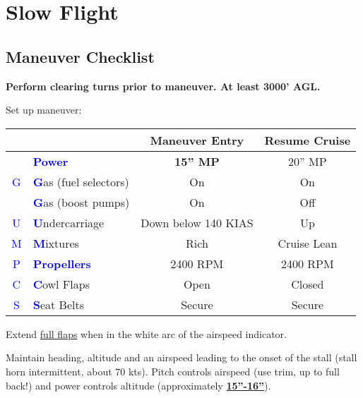 {\newpage

\section{Slow Flight}
\subsection{Maneuver Checklist}

\textbf{Perform clearing turns prior to maneuver. At least 3000' AGL.}

Set up maneuver:

\begin{table}[H]
\centering
\begin{tabular}{|c|l|c|c|}
\hline
                    &                                                 & \textbf{Maneuver Entry} & \textbf{Resume Cruise} \\ \hline
                    & \textcolor{blue}{\textbf{Power}}                & \textbf{15'' MP}        & 20'' MP                \\ \hline
\textcolor{blue}{G} & \textcolor{blue}{\textbf{G}}as (fuel selectors) & On                      & On                     \\
                    & \textcolor{blue}{\textbf{G}}as (boost pumps)    & On                      & Off                    \\ \hline
\textcolor{blue}{U} & \textcolor{blue}{\textbf{U}}ndercarriage        & Down below 140 KIAS     & Up                     \\ \hline
\textcolor{blue}{M} & \textcolor{blue}{\textbf{M}}ixtures             & Rich                    & Cruise Lean            \\ \hline
\textcolor{blue}{P} & \textcolor{blue}{\textbf{Propellers}}           & 2400 RPM                & 2400 RPM               \\ \hline
\textcolor{blue}{C} & \textcolor{blue}{\textbf{C}}owl Flaps           & Open                    & Closed                 \\ \hline
\textcolor{blue}{S} & \textcolor{blue}{\textbf{S}}eat Belts           & Secure                  & Secure                 \\ \hline
\end{tabular}
\end{table}

Extend \underline{full flaps} when in the white arc of the airspeed indicator.

Maintain heading, altitude and an airspeed leading to the onset of the stall (stall horn intermittent, about 70 kts).
Pitch controls airspeed (use trim, up to full back!) and power controls altitude (approximately \underline{\textbf{15''-16''}}).

}
